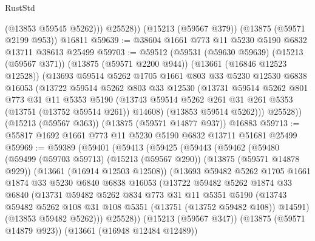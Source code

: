 \begin{lexlean}{RustStd}
\begin{coremodule}
            (@13853 @59545 @5262)))
        @25528))
    (@15213 (@59567 @379))
    (@13875 (@59571 @2199 @953))
    @16811
@59639 := @38604 @1661 @773 @11 @5230 @5190 @6832 @13711 @38613 @25499
@59703 := @59512
    (@59531
      (@59630 @59639)
      (@15213 (@59567 @371))
      (@13875 (@59571 @2200 @944))
      (@13661 (@16846 @12523 @12528))
      (@13693
        @59514
        @5262
        @1705
        @1661
        @803
        @33
        @5230
        @12530
        @6838
        @16053
        (@13722
          @59514
          @5262
          @803
          @33
          @12530
          (@13731
            @59514
            @5262
            @801
            @773
            @31
            @11
            @5353
            @5190
            (@13743 @59514 @5262 @261 @31 @261 @5353 (@13751 (@13752 @59514 @261)) @14608)
            (@13853 @59514 @5262)))
        @25528))
    (@15213 (@59567 @363))
    (@13875 (@59571 @14877 @937))
    @16883
@59713 := @55817 @1692 @1661 @773 @11 @5230 @5190 @6832 @13711 @51681 @25499
@59969 := @59389
    (@59401
      (@59413
        (@59425
          (@59443
            (@59462
              (@59480
                (@59499
                  (@59703 @59713)
                  (@15213 (@59567 @290))
                  (@13875 (@59571 @14878 @929))
                  (@13661 (@16914 @12503 @12508))
                  (@13693
                    @59482
                    @5262
                    @1705
                    @1661
                    @1874
                    @33
                    @5230
                    @6840
                    @6838
                    @16053
                    (@13722
                      @59482
                      @5262
                      @1874
                      @33
                      @6840
                      (@13731
                        @59482
                        @5262
                        @834
                        @773
                        @31
                        @11
                        @5351
                        @5190
                        (@13743
                          @59482
                          @5262
                          @108
                          @31
                          @108
                          @5351
                          (@13751 (@13752 @59482 @108))
                          @14591)
                        (@13853 @59482 @5262)))
                    @25528))
                (@15213 (@59567 @347))
                (@13875 (@59571 @14879 @923))
                (@13661 (@16948 @12484 @12489))

\end{coremodule}
\end{lexlean}
